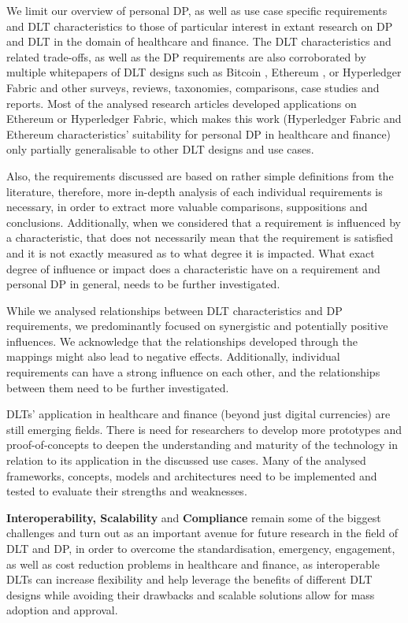 We limit our overview of personal DP, as well as use case specific requirements and DLT characteristics to those of particular interest in extant research on DP and DLT in the domain of healthcare and finance. The DLT characteristics and related trade-offs, as well as the DP requirements are also corroborated by multiple whitepapers of DLT designs such as Bitcoin \cite{bitcoin}, Ethereum \cite{ethereum}, or Hyperledger Fabric \cite{hyperledger} and other surveys, reviews, taxonomies, comparisons, case studies and reports. Most of the analysed research articles developed applications on Ethereum or Hyperledger Fabric, which makes this work (Hyperledger Fabric and Ethereum characteristics' suitability for personal DP in healthcare and finance) only partially generalisable to other DLT designs and use cases. 

Also, the requirements discussed are based on rather simple definitions from the literature, therefore, more in-depth analysis of each individual requirements is necessary, in order to extract more valuable comparisons, suppositions and conclusions. Additionally, when we considered that a requirement is influenced by a characteristic, that does not necessarily mean that the requirement is satisfied and it is not exactly measured as to what degree it is impacted. What exact degree of influence or impact does a characteristic have on a requirement and personal DP in general, needs to be further investigated.

While we analysed relationships between DLT characteristics and DP requirements, we predominantly focused on synergistic and potentially positive influences. We acknowledge that the relationships developed through the mappings might also lead to negative effects. Additionally, individual requirements can have a strong influence on each other, and the relationships between them need to be further investigated. 

DLTs' application in healthcare and finance (beyond just digital currencies) are still emerging fields. There is need for researchers to develop more prototypes and proof-of-concepts to deepen the understanding and maturity of the technology in relation to its application in the discussed use cases. Many of the analysed frameworks, concepts, models and architectures need to be implemented and tested to evaluate their strengths and weaknesses.

\textbf{Interoperability, Scalability} and \textbf{Compliance} remain some of the biggest challenges and turn out as an important avenue for future research in the field of DLT and DP, in order to overcome the standardisation, emergency, engagement, as well as cost reduction problems in healthcare and finance, as interoperable DLTs can increase flexibility and help leverage the benefits of different DLT designs while avoiding their drawbacks and scalable solutions allow for mass adoption and approval.

